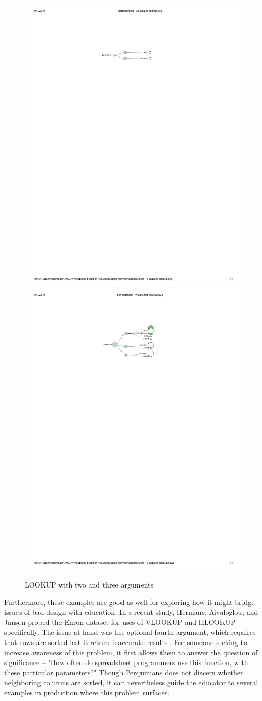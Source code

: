 \documentclass[conference]{IEEEtran}
\newcommand{\toolname}{Perquimans }
\begin{document}
	\begin{figure}[h] \centering \includegraphics[width=.5\textwidth]{lookup-2}
		\includegraphics[width=.5\textwidth]{lookup-3}
		\caption{LOOKUP with two and three arguments}  \label{fig:lookups} \end{figure}
	
	Furthermore, these examples are good as well for exploring how it might bridge
	issues of bad design with education. In a recent study, Hermans, Aivaloglou,
	and Jansen probed the Enron dataset for uses of VLOOKUP and HLOOKUP
	specifically. The issue at hand was the optional fourth argument, which
	requires that rows are sorted lest it return inaccurate results
	\cite{hermans2015detecting}. For someone seeking to increase awareness of this
	problem, it first allows them to answer the question of significance -- "How
	often do spreadsheet programmers use this function, with these particular
	parameters?" Though \toolname does not discern whether neighboring columns are
	sorted, it can nevertheless guide the educator to several examples in
	production where this problem surfaces. \par
	
\end{document}

